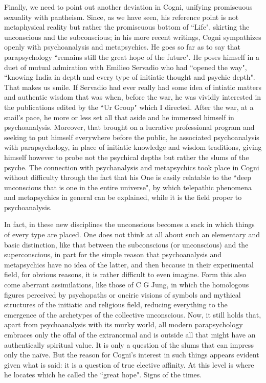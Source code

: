 Finally, we need to point out another deviation in Cogni, unifying promiscuous sexuality with pantheism. Since, as we
have seen, his reference point is not metaphysical reality but rather the promiscuous bottom of ``Life", skirting the
unconscious and the subconscious; in his more recent writings, Cogni sympathizes openly with psychoanalysis and
metapsychics. He goes so far as to say that parapsychology ``remains still the great hope of the future". He poses
himself in a duet of mutual admiration with Emilieo Servadio who had ``opened the way", ``knowing India in depth and
every type of initiatic thought and psychic depth". That makes us smile. If Servadio had ever really had some idea of
intiatic matters and authentic wisdom that was when, before the war, he was vividly interested in the publications
edited by the ``Ur Group" which I directed. After the war, at a snail's pace, he more or less set
all that aside and he immersed himself in psychoanalysis. Moreover, that brought on a lucrative professional program
and seeking to put himself everywhere before the public, he associated psychoanalysis with parapsychology, in place of
initiatic knowledge and wisdom traditions, giving himself however to probe not the psychical depths but rather the
slums of the psyche. The connection with psychanalysis and metapsychics took place in Cogni without difficulty through
the fact that his One is easily relatable to the ``deep unconscious that is one in the entire universe", by which
telepathic phenomena and metapsychics in general can be explained, while it is the field proper to psychoanalysis.

In fact, in these new disciplines the unconscious becomes a sack in which things of every type are placed. One does not
think at all about such an elementary and basic distinction, like that between the subconscious (or unconscious) and
the superconscious, in part for the simple reason that psychoanalysis and metapsychics have no idea of the latter, and
then because in their experimental field, for obvious reasons, it is rather difficult to even imagine. Form this also
come aberrant assimilations, like those of C G Jung, in which the homologous figures perceived by psychopaths or
oneiric visions of symbols and mythical structures of the initiatic and religious field, reducing everything to the
emergence of the archetypes of the collective unconscious. Now, it still holds that, apart from psychoanalysis with its
murky world, all modern parapsychology embraces only the offal of the extranormal and is outside all that might have an
authentically spiritual value. It is only a question of the slums that can impress only the naïve. But the reason for
Cogni's interest in such things appears evident given what is said: it is a question of true
elective affinity. At this level is where he locates which he called the ``great hope". Signs of the times.

